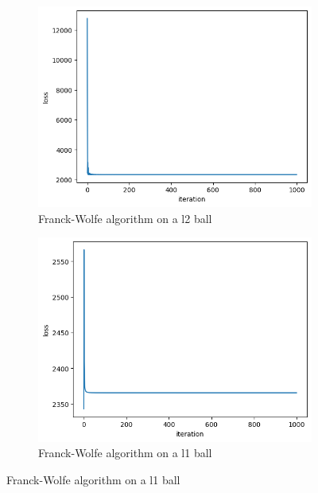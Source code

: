 \documentclass{article}
\begin{document}
     \begin{figure}[h!]
        \begin{subfigure}{.5\textwidth}
            \centering
            \includegraphics[width=\linewidth]{images/part4_1.png}
            \caption{Franck-Wolfe algorithm on a l2 ball}
            \label{fig:oc}
        \end{subfigure}
        \hfill
        \begin{subfigure}{.5\textwidth}
            \centering
            \includegraphics[width=\linewidth]{images/part4_3.png}
            \caption{Franck-Wolfe algorithm on a l1 ball}
            \label{fig:od}
        \end{subfigure}
    \end{figure}
        
\end{document}
